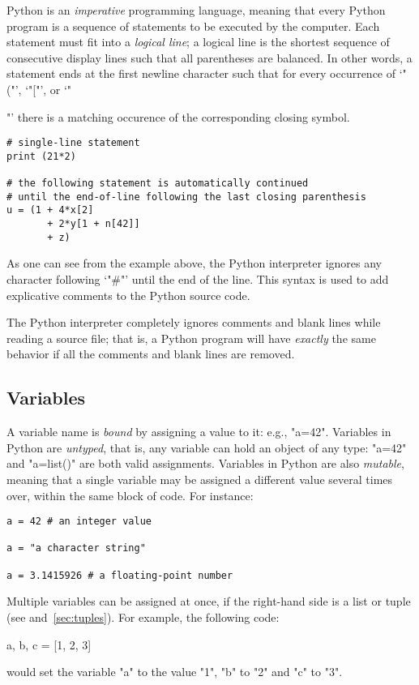 Python is an \emph{imperative} programming language, meaning that
every Python program is a sequence of statements to be executed by the
computer.  Each statement must fit into a \emph{logical line}; a
logical line is the shortest sequence of consecutive display lines
such that all parentheses are balanced.  In other words, a statement
ends at the first newline character such that for every occurrence of
`"("', `"["', or `"{"' there is a matching occurence of the
corresponding closing symbol.
\begin{lstlisting}
# single-line statement
print (21*2)

# the following statement is automatically continued
# until the end-of-line following the last closing parenthesis
u = (1 + 4*x[2] 
       + 2*y[1 + n[42]]
       + z)
\end{lstlisting}
As one can see from the example above, the Python interpreter ignores
any character following `"#"' until the end of the line.  This
syntax is used to add explicative comments to the Python source code.

The Python interpreter completely ignores comments and blank lines
while reading a source file; that is, a Python program will have
\emph{exactly} the same behavior if all the comments and blank lines
are removed.

\subsection{Variables}
\label{sec:variables}

A variable name is \emph{bound} by assigning a value to it: e.g.,
"a=42".  Variables in Python are \emph{untyped}, that is, any
variable can hold an object of any type: "a=42" and "a=list()"
are both valid assignments. Variables in Python are also
\emph{mutable}, meaning that a single variable may be assigned a
different value several times over, within the same block of code.
For instance:
\begin{lstlisting}
a = 42 # an integer value

a = "a character string"

a = 3.1415926 # a floating-point number
\end{lstlisting}

Multiple variables can be assigned at once, if the right-hand side is
a list or tuple (see  and~\ref{sec:tuples}). For
example, the following code:
\begin{codexmp}
  a, b, c = [1, 2, 3]
\end{codexmp}
would set the variable "a" to the value "1", "b" to "2" and "c" to
"3".

}
